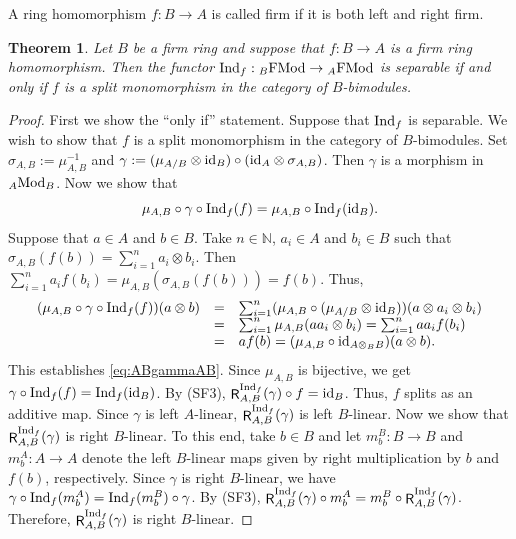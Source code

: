 \documentclass[12pt]{amsart}
\newtheorem{thm}{Theorem}
\theoremstyle{definition}
\newcommand{\N}{\mathbb{N}}
\newcommand{\Mod}{{\rm Mod}}
\newcommand{\FMod}{{\rm FMod}}
\newcommand{\id}{{\rm id}}
\newcommand{\Ind}{{\rm Ind}}
\DeclareMathOperator{\R}{\mathsf R}
\begin{document}
A ring homomorphism $f : B \to A$ is called firm if it 
is both left and right firm.

\begin{thm}
Let $B$ be a firm ring and suppose that 
$f : B \to A$ is a firm 
ring homomorphism. Then the functor
$\Ind_f : {}_B \FMod \to {}_A \FMod$ is 
separable if and only if 
$f$ is a split monomorphism in the category 
of $B$-bimodules. 
\end{thm}

\begin{proof}
First we show the ``only if'' statement.
Suppose that $\Ind_f$ is separable.
We wish to show that $f$ is a split monomorphism
in the category of $B$-bimodules.
Set $\sigma_{A,B} := \mu_{A,B}^{-1}$ 
and $\gamma := (\mu_{A/B} \otimes \id_B) \circ 
(\id_A \otimes \sigma_{A,B})$. 
Then $\gamma$ is 
a morphism in ${}_A \Mod_B$. 
Now we show that
\begin{equation}\label{eq:ABgammaAB}
\mu_{A,B} \circ \gamma \circ 
\Ind_f(f) = 
\mu_{A,B} \circ 
\Ind_f(\id_B). 
\end{equation}
Suppose that 
$a \in A$ and $b \in B$.
Take $n \in \N$, $a_i \in A$ and $b_i \in B$
such that $\sigma_{A,B}( f(b) ) = 
\sum_{i=1}^n a_i \otimes b_i$.
Then $\sum_{i=1}^n a_i f(b_i) = 
\mu_{A,B}(\sigma_{A,B}(f(b))) = f(b)$.
Thus,
\[
\begin{array}{rcl}
(\mu_{A,B} \circ \gamma \circ \Ind_f(f))
(a \otimes b) 
&=& 
\sum_{i=1}^n 
(\mu_{A,B} \circ (\mu_{A/B} \otimes \id_B))
(a \otimes a_i \otimes b_i) \\ 
&=&
\sum_{i=1}^n \mu_{A,B}( a a_i \otimes b_i ) 
= \sum_{i=1}^n a a_i f(b_i) \\
&=& 
a f(b) = 
(\mu_{A,B} \circ \id_{A \otimes_B B})(a \otimes b).
\end{array}
\]
This establishes \eqref{eq:ABgammaAB}.
Since $\mu_{A,B}$ is bijective, we get 
$\gamma \circ \Ind_f(f) = 
\Ind_f(\id_B)$.
By (SF3), 
$\R_{A,B}^{\Ind_f}(\gamma) \circ f = \id_B$.
Thus, $f$ splits as an additive map.
Since $\gamma$ is left $A$-linear,
$\R_{A,B}^{\Ind_f}(\gamma)$ is 
left $B$-linear. Now we show that 
$\R_{A,B}^{\Ind_f}(\gamma)$
is right $B$-linear.
To this end, take $b \in B$ and let
$m_b^B : B \to B$ and $m_b^A : A \to A$
denote the left $B$-linear maps given by right multiplication by $b$ and $f(b)$, respectively.
Since $\gamma$ is right $B$-linear, we have
$\gamma \circ \Ind_f(m_b^A)=\Ind_f(m_b^B)\circ \gamma$.
By (SF3), $\R_{A,B}^{\Ind_f}(\gamma)\circ m_b^A
= m_b^B\circ \R_{A,B}^{\Ind_f}(\gamma)$.
Therefore, $\R_{A,B}^{\Ind_f}(\gamma)$ is right $B$-linear.


\end{proof}
\end{document}
